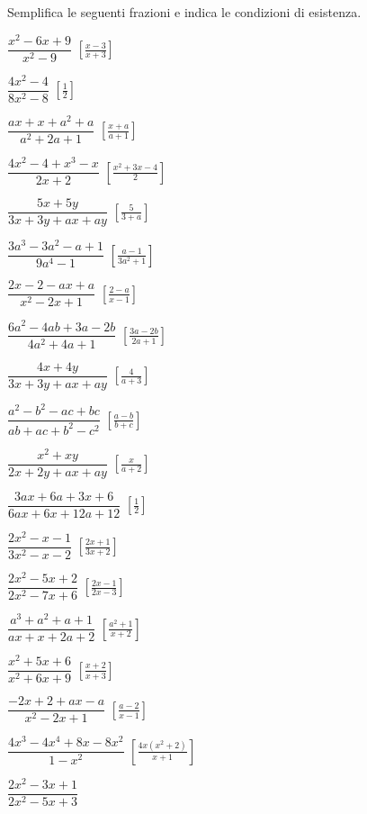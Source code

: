 \begin{esercizio}[\Ast]
\label{ese:19.5}
Semplifica le seguenti frazioni e indica le condizioni di esistenza.
\begin{multicols}{2}
\begin{enumeratea}
 \item \(\dfrac{x^{2}-6x+9}{x^{2}-9}\)
  \hfill \(\left[\frac{x-3}{x+3}\right]\)
 \item \(\dfrac{4x^{2}-4}{8x^{2}-8}\)
  \hfill \(\left[\frac{1}{2}\right]\)
 \item \(\dfrac{ax+x+a^{2}+a}{a^{2}+2a+1}\)
  \hfill \(\left[\frac{x+a}{a+1}\right]\)
 \item \(\dfrac{4x^{2}-4+x^{3}-x}{2x+2}\)
  \hfill \(\left[\frac{x^{2}+3x-4}{2}\right]\)
 \item \(\dfrac{5x+5y}{3x+3y+ax+ay}\)
  \hfill \(\left[\frac{5}{3+a}\right]\)
 \item \(\dfrac{3a^{3}-3a^{2}-a+1}{9a^{4}-1}\)
  \hfill \(\left[\frac{a-1}{3a^{2}+1}\right]\)
 \item \(\dfrac{2x-2-ax+a}{x^{2}-2x+1}\)
  \hfill \(\left[\frac{2-a}{x-1}\right]\)
 \item \(\dfrac{6a^{2}-4ab+3a-2b}{4a^{2}+4a+1}\)
  \hfill \(\left[\frac{3a-2b}{2a+1}\right]\)
 \item \(\dfrac{4x+4y}{3x+3y+ax+ay}\)
  \hfill \(\left[\frac{4}{a+3}\right]\)
 \item \(\dfrac{a^{2}-b^{2}-ac+bc}{ab+ac+b^{2}-c^{2}}\)
  \hfill \(\left[\frac{a-b}{b+c}\right]\)
 \item \(\dfrac{x^{2}+xy}{2x+2y+ax+ay}\)
  \hfill \(\left[\frac{x}{a+2}\right]\)
 \item \(\dfrac{3ax+6a+3x+6}{6ax+6x+12a+12}\)
  \hfill \(\left[\frac{1}{2}\right]\)
 \item \(\dfrac{2x^{2}-x-1}{3x^{2}-x-2}\)
  \hfill \(\left[\frac{2x+1}{3x+2}\right]\)
 \item \(\dfrac{2x^{2}-5x+2}{2x^{2}-7x+6}\)
  \hfill \(\left[\frac{2x-1}{2x-3}\right]\)
 \item \(\dfrac{a^{3}+a^{2}+a+1}{ax+x+2a+2}\)
  \hfill \(\left[\frac{a^2+1}{x+2}\right]\)
 \item \(\dfrac{x^{2}+5x+6}{x^{2}+6x+9}\)
  \hfill \(\left[\frac{x+2}{x+3}\right]\)
 \item \(\dfrac{-2x+2+ax-a}{x^{2}-2x+1}\)
  \hfill \(\left[\frac{a-2}{x-1}\right]\)
 \item \(\dfrac{4x^{3}-4x^{4}+8x-8x^{2}}{1-x^{2}}\)
  \hfill \(\left[\frac{4x\left(x^2+2\right)}{x+1}\right]\)
 \item \(\dfrac{2x^{2}-3x+1}{2x^{2}-5x+3}\)

\end{enumeratea}
\end{multicols}
\end{esercizio}
